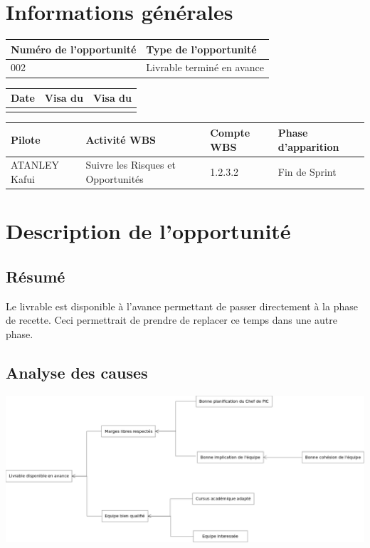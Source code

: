 \section*{Informations générales}
 
\begin{table}[H]
\centering
	\begin{tabularx}{16.8cm}{|X|X|}
	\hline
	 Numéro de l'opportunité & Type de l'opportunité \\
	\hline
	 002 & Livrable terminé en avance  \\
	\hline
	\end{tabularx}
\end{table}

\begin{table}[H]
\centering
	\begin{tabularx}{16.8cm}{|X|X|X|}
	\hline
	Date & Visa du \RQ & Visa du \CP \\
	\hline
	  & & \\
	\hline
	\end{tabularx}
\end{table}

\begin{table}[H]
\centering
	\begin{tabularx}{16.8cm}{|X|X|X|X|}
	\hline
	 Pilote & Activité WBS & Compte WBS & Phase d'apparition \\
	\hline
	 ATANLEY Kafui & Suivre les Risques et Opportunités & 1.2.3.2 & Fin de Sprint \\
	\hline
	\end{tabularx}
\end{table}

\section*{Description de l'opportunité}

\subsection*{Résumé}
	Le livrable est disponible à l'avance permettant de passer directement à la phase de recette. Ceci permettrait de prendre  de replacer ce temps dans une autre phase.
	
\subsection*{Analyse des causes}
	
	\includegraphics[scale=0.27]{images/AnalyseOpportunite_nPourquoi_FDO002}

